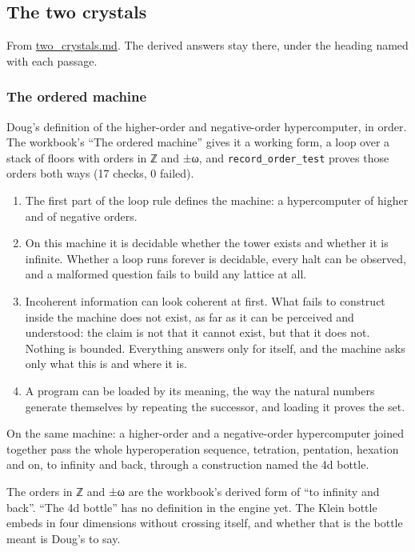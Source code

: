 \subsection{\texorpdfstring{The two crystals}{The two crystals}}

From \hyperref[chap:two-crystals]{two\_\allowbreak{}crystals.md}. The derived answers stay there, under the heading named with each passage.

\subsubsection{\texorpdfstring{The ordered machine}{The ordered machine}}

Doug's definition of the higher-order and negative-order hypercomputer, in order. The workbook's “The ordered machine” gives it a working form, a loop over a stack of floors with orders in ℤ and ±ω, and \texttt{record\_\allowbreak{}order\_\allowbreak{}test} proves those orders both ways (17 checks, 0 failed).

\begin{enumerate}
\item The first part of the loop rule defines the machine: a hypercomputer of higher and of negative orders.
\item On this machine it is decidable whether the tower exists and whether it is infinite. Whether a loop runs forever is decidable, every halt can be observed, and a malformed question fails to build any lattice at all.
\item Incoherent information can look coherent at first. What fails to construct inside the machine does not exist, as far as it can be perceived and understood: the claim is not that it cannot exist, but that it does not. Nothing is bounded. Everything answers only for itself, and the machine asks only what this is and where it is.
\item A program can be loaded by its meaning, the way the natural numbers generate themselves by repeating the successor, and loading it proves the set.
\end{enumerate}

On the same machine: a higher-order and a negative-order hypercomputer joined together pass the whole hyperoperation sequence, tetration, pentation, hexation and on, to infinity and back, through a construction named the 4d bottle.

The orders in ℤ and ±ω are the workbook's derived form of “to infinity and back”. “The 4d bottle” has no definition in the engine yet. The Klein bottle embeds in four dimensions without crossing itself, and whether that is the bottle meant is Doug's to say.

